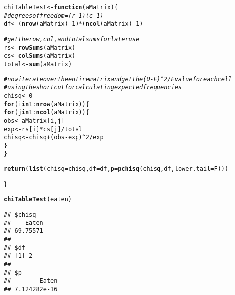 \documentclass{article}\usepackage[]{graphicx}\usepackage[]{color}
\makeatletter
\newcommand{\hlnum}[1]{\textcolor[rgb]{0.686,0.059,0.569}{#1}}%
\newcommand{\hlcom}[1]{\textcolor[rgb]{0.678,0.584,0.686}{\textit{#1}}}%
\newcommand{\hlopt}[1]{\textcolor[rgb]{0,0,0}{#1}}%
\newcommand{\hlstd}[1]{\textcolor[rgb]{0.345,0.345,0.345}{#1}}%
\newcommand{\hlkwa}[1]{\textcolor[rgb]{0.161,0.373,0.58}{\textbf{#1}}}%
\newcommand{\hlkwb}[1]{\textcolor[rgb]{0.69,0.353,0.396}{#1}}%
\newcommand{\hlkwc}[1]{\textcolor[rgb]{0.333,0.667,0.333}{#1}}%
\newcommand{\hlkwd}[1]{\textcolor[rgb]{0.737,0.353,0.396}{\textbf{#1}}}%
\newenvironment{kframe}{%
 \def\at@end@of@kframe{}%
 \ifinner\ifhmode%
  \def\at@end@of@kframe{\end{minipage}}%
  \begin{minipage}{\columnwidth}%
 \fi\fi%
 \def\FrameCommand##1{\hskip\@totalleftmargin \hskip-\fboxsep
 \colorbox{shadecolor}{##1}\hskip-\fboxsep
     \hskip-\linewidth \hskip-\@totalleftmargin \hskip\columnwidth}%
 \MakeFramed {\advance\hsize-\width
   \@totalleftmargin\z@ \linewidth\hsize
   \@setminipage}}%
 {\par\unskip\endMakeFramed%
 \at@end@of@kframe}
\newenvironment{knitrout}{}{} %
\makeatother
\begin{document}
\begin{knitrout}
\color{fgcolor}\begin{kframe}
\begin{alltt}
\hlstd{chiTableTest} \hlkwb{<-} \hlkwa{function}\hlstd{(}\hlkwc{aMatrix}\hlstd{)\{}
  \hlcom{#degrees of freedom = (r-1)(c-1)}
  \hlstd{df} \hlkwb{<-} \hlstd{(}\hlkwd{nrow}\hlstd{(aMatrix)}\hlopt{-}\hlnum{1}\hlstd{)} \hlopt{*} \hlstd{(}\hlkwd{ncol}\hlstd{(aMatrix)}\hlopt{-}\hlnum{1}\hlstd{)}

  \hlcom{#get the row, col, and total sums for later use}
  \hlstd{rs} \hlkwb{<-} \hlkwd{rowSums}\hlstd{(aMatrix)}
  \hlstd{cs} \hlkwb{<-} \hlkwd{colSums}\hlstd{(aMatrix)}
  \hlstd{total} \hlkwb{<-} \hlkwd{sum}\hlstd{(aMatrix)}

  \hlcom{#now iterate over the entire matrix and get the (O-E)^2/E value for each cell}
  \hlcom{#using the shortcut for calculating expected frequencies}
  \hlstd{chisq}\hlkwb{<-}\hlnum{0}
  \hlkwa{for}\hlstd{(i} \hlkwa{in} \hlnum{1}\hlopt{:}\hlkwd{nrow}\hlstd{(aMatrix))\{}
    \hlkwa{for}\hlstd{(j} \hlkwa{in} \hlnum{1}\hlopt{:}\hlkwd{ncol}\hlstd{(aMatrix))\{}
      \hlstd{obs} \hlkwb{<-} \hlstd{aMatrix[i,j]}
      \hlstd{exp} \hlkwb{<-} \hlstd{rs[i]} \hlopt{*} \hlstd{cs[j]}\hlopt{/}\hlstd{total}
      \hlstd{chisq} \hlkwb{<-} \hlstd{chisq} \hlopt{+} \hlstd{(obs}\hlopt{-}\hlstd{exp)}\hlopt{^}\hlnum{2}\hlopt{/}\hlstd{exp}
    \hlstd{\}}
  \hlstd{\}}

  \hlkwd{return}\hlstd{(}\hlkwd{list}\hlstd{(}\hlkwc{chisq} \hlstd{= chisq,} \hlkwc{df} \hlstd{= df,} \hlkwc{p} \hlstd{=} \hlkwd{pchisq}\hlstd{(chisq, df,} \hlkwc{lower.tail}\hlstd{=F)))}

\hlstd{\}}

\hlkwd{chiTableTest}\hlstd{(eaten)}
\end{alltt}
\begin{verbatim}
## $chisq
##    Eaten 
## 69.75571 
## 
## $df
## [1] 2
## 
## $p
##        Eaten 
## 7.124282e-16
\end{verbatim}
\end{kframe}
\end{knitrout}
\end{document}
